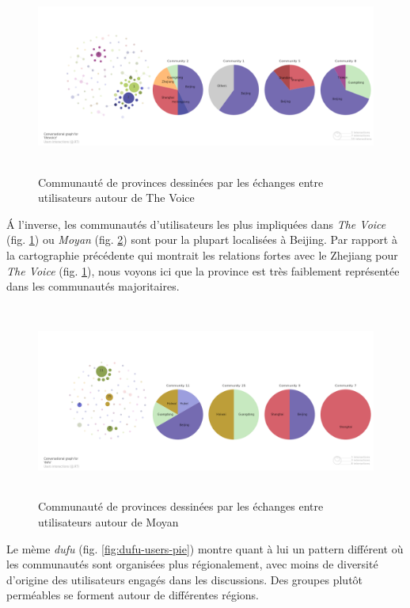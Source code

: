 \begin{figure}[htbp]
    \centering
    \includegraphics[width=5.9996in,height=2.5004in]{figures/chap4/chapitre4-img56.png}
    \caption{
        Communauté de provinces dessinées par les échanges entre utilisateurs autour de The Voice
    }
    \label{fig:voice-users-pie}
\end{figure}

\'A l{\textquoteright}inverse, les communautés d{\textquoteright}utilisateurs les plus impliquées dans \textit{The Voice} (fig. \ref{fig:voice-users-pie}) ou \textit{Moyan} (fig. \ref{fig:moyan-users-pie}) sont pour la plupart localisées \`a Beijing. Par rapport \`a la cartographie précédente qui montrait les relations fortes avec le Zhejiang pour \textit{The Voice} (fig. \ref{fig:voice-users-pie}), nous voyons ici que la province est très faiblement représentée dans les communautés majoritaires. 

\begin{figure}[htbp]
  \centering
   \includegraphics[width=5.9996in,height=2.5004in]{figures/chap4/chapitre4-img57.png}
    \caption{
        Communauté de provinces dessinées par les échanges entre utilisateurs autour de Moyan
    }
    \label{fig:moyan-users-pie}
\end{figure}

Le mème \textit{dufu} (fig. \ref{fig:dufu-users-pie}) montre quant \`a lui un pattern différent o\`u les communautés sont organisées plus régionalement, avec moins de diversité d{\textquoteright}origine des utilisateurs engagés dans les discussions. Des groupes plutôt perméables se forment autour de différentes régions.

